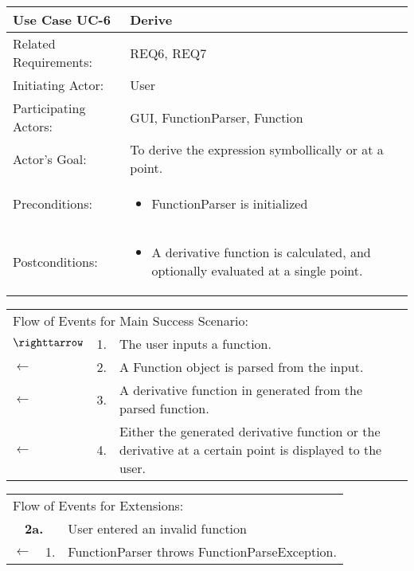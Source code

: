 \documentclass[11pt]{article}
\begin{document}
\newpage

\begin{center}
\begin{tabular}{p{1.5in}p{5in}}
\hline
\textbf{Use Case UC-6}     & \textbf{Derive} \\ \hline
Related Requirements: & REQ6, REQ7 \\
Initiating Actor:     & User \\
Participating Actors: & GUI, FunctionParser, Function \\
Actor's Goal:          & To derive the expression symbollically or at a point. \\
Preconditions:         & \begin{itemize}[nosep]
		      \item  FunctionParser is initialized
                         \end{itemize} \\
Postconditions:        & \begin{itemize}[nosep]
                         \item A derivative function is calculated, and optionally evaluated at a single point.
                         \end{itemize} \\ \hline
\end{tabular}

\begin{tabular}{p{.25in}p{.25in}p{5.8in}}
\multicolumn{3}{l}{Flow of Events for Main Success Scenario:} \\
$\righttarrow$ & 1. & The user inputs a function.\\
$\leftarrow$   & 2. & A Function object is parsed from the input.\\
$\leftarrow$   & 3. & A derivative function in generated from the parsed function.\\
$\leftarrow$   & 4. & Either the generated derivative function or the derivative at a certain point is displayed to the user.\\ 
\end{tabular}

\begin{tabular}{p{.25in}p{.25in}p{5.8in}}
\multicolumn{3}{l}{Flow of Events for Extensions:} \\
\multicolumn{2}{c}{\textbf{2a.}} & User entered an invalid function \\
$\leftarrow$  & 1.           & FunctionParser throws FunctionParseException.\\
\end{tabular}
\end{center}
\end{document}
